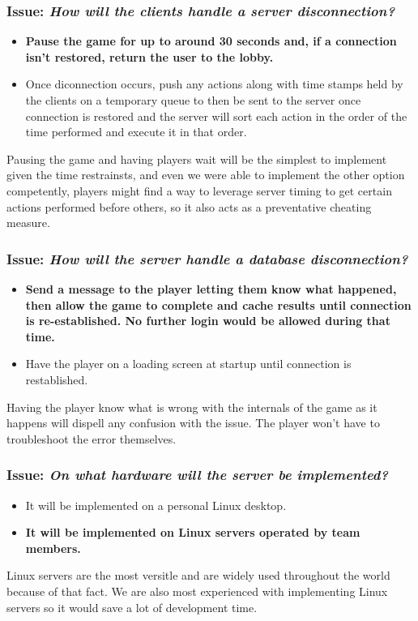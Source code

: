 \subsubsection*{Issue: \textit{How will the clients handle a server disconnection?}}

  \begin{itemize}
    \item \textbf{Pause the game for up to around 30 seconds and, if a connection isn't restored, return the user to the lobby.}
    \item Once diconnection occurs, push any actions along with time stamps held by the clients on a temporary queue to then be sent to the server once connection is restored and the server will sort each action in the order of the time performed and execute it in that order. 
  \end{itemize}

Pausing the game and having players wait will be the simplest to implement given the time restrainsts, and even we were able to implement the other option competently, players might find a way to leverage server timing to get certain actions performed before others, so it also acts as a preventative cheating measure.

\subsubsection*{Issue: \textit{How will the server handle a database disconnection?}}

  \begin{itemize}
    \item \textbf{Send a message to the player letting them know what happened, then allow the game to complete and cache results until connection is re-established. No further login would be allowed during that time.}
    \item Have the player on a loading screen at startup until connection is restablished.
  \end{itemize}

Having the player know what is wrong with the internals of the game as it happens will dispell any confusion with the issue. The player won't have to troubleshoot the error themselves.

\subsubsection*{Issue: \textit{On what hardware will the server be implemented?}}

  \begin{itemize}
    \item It will be implemented on a personal Linux desktop.
    \item \textbf{It will be implemented on Linux servers operated by team members.}
  \end{itemize}

Linux servers are the most versitle and are widely used throughout the world because of that fact. We are also most experienced with implementing Linux servers so it would save a lot of development time.
